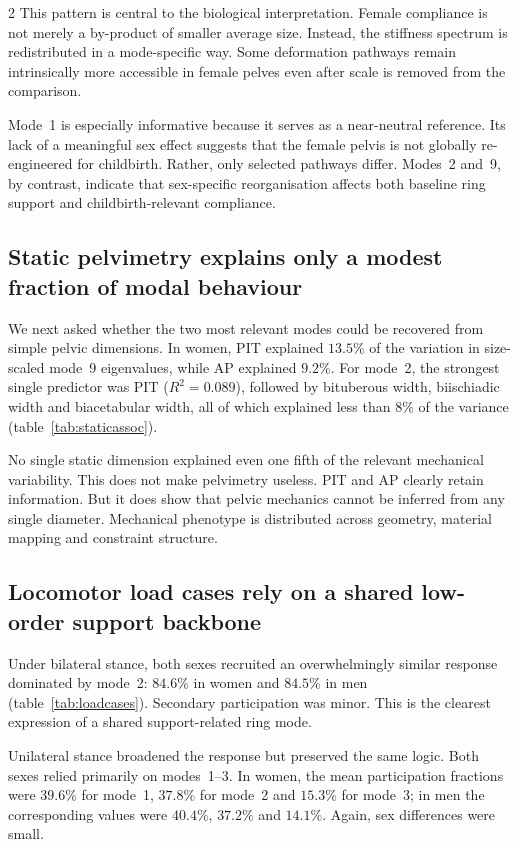 \documentclass[openacc]{rsproca_new}
\begin{document}
\begin{multicols}{2}
This pattern is central to the biological interpretation. Female compliance is not merely a by-product of smaller average size. Instead, the stiffness spectrum is redistributed in a mode-specific way. Some deformation pathways remain intrinsically more accessible in female pelves even after scale is removed from the comparison.

Mode~1 is especially informative because it serves as a near-neutral reference. Its lack of a meaningful sex effect suggests that the female pelvis is not globally re-engineered for childbirth. Rather, only selected pathways differ. Modes~2 and~9, by contrast, indicate that sex-specific reorganisation affects both baseline ring support and childbirth-relevant compliance.

\subsection{Static pelvimetry explains only a modest fraction of modal behaviour}

We next asked whether the two most relevant modes could be recovered from simple pelvic dimensions. In women, PIT explained $13.5\%$ of the variation in size-scaled mode~9 eigenvalues, while AP explained $9.2\%$. For mode~2, the strongest single predictor was PIT ($R^2=0.089$), followed by bituberous width, biischiadic width and biacetabular width, all of which explained less than $8\%$ of the variance (table~\ref{tab:staticassoc}).

No single static dimension explained even one fifth of the relevant mechanical variability. This does not make pelvimetry useless. PIT and AP clearly retain information. But it does show that pelvic mechanics cannot be inferred from any single diameter. Mechanical phenotype is distributed across geometry, material mapping and constraint structure.

\subsection{Locomotor load cases rely on a shared low-order support backbone}

Under bilateral stance, both sexes recruited an overwhelmingly similar response dominated by mode~2: $84.6\%$ in women and $84.5\%$ in men (table~\ref{tab:loadcases}). Secondary participation was minor. This is the clearest expression of a shared support-related ring mode.

Unilateral stance broadened the response but preserved the same logic. Both sexes relied primarily on modes~1--3. In women, the mean participation fractions were $39.6\%$ for mode~1, $37.8\%$ for mode~2 and $15.3\%$ for mode~3; in men the corresponding values were $40.4\%$, $37.2\%$ and $14.1\%$. Again, sex differences were small.


\end{multicols}
\end{document}
